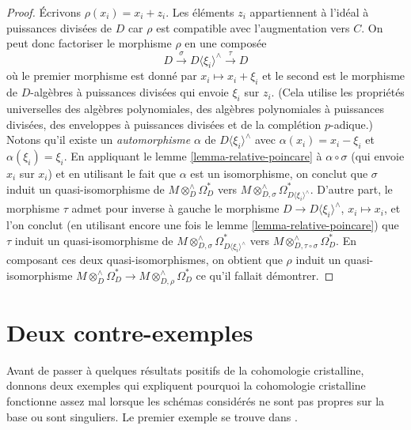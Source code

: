 \begin{proof}
\medskip\noindent
Écrivons $\rho(x_i) = x_i + z_i$. Les éléments $z_i$ appartiennent à
l'idéal à puissances divisées de $D$ car $\rho$ est compatible avec
l'augmentation vers $C$. On peut donc factoriser le morphisme $\rho$
en une composée
$$
D \xrightarrow{\sigma} D\langle \xi_i \rangle^\wedge \xrightarrow{\tau} D
$$
où le premier morphisme est donné par $x_i \mapsto x_i + \xi_i$ et le
second est le morphisme de $D$-algèbres à puissances divisées qui envoie $\xi_i$ sur $z_i$.
(Cela utilise les propriétés universelles des algèbres polynomiales, des algèbres
polynomiales à puissances divisées, des enveloppes à puissances divisées et de la complétion $p$-adique.)
Notons qu'il existe un {\it automorphisme} $\alpha$ de
$D\langle \xi_i \rangle^\wedge$ avec $\alpha(x_i) = x_i - \xi_i$
et $\alpha(\xi_i) = \xi_i$. En appliquant le lemme \ref{lemma-relative-poincare}
à $\alpha \circ \sigma$ (qui envoie $x_i$ sur $x_i$) et en utilisant le fait que
$\alpha$ est un isomorphisme, on conclut que $\sigma$ induit un
quasi-isomorphisme de $M \otimes^\wedge_D \Omega^*_D$ vers
$M \otimes^\wedge_{D, \sigma} \Omega^*_{D\langle \xi_i \rangle^\wedge}$.
D'autre part, le morphisme $\tau$ admet pour inverse à gauche le
morphisme $D \to D\langle \xi_i \rangle^\wedge$, $x_i \mapsto x_i$,
et l'on conclut (en utilisant encore une fois le lemme \ref{lemma-relative-poincare})
que $\tau$ induit un quasi-isomorphisme de
$M \otimes^\wedge_{D, \sigma} \Omega^*_{D\langle \xi_i \rangle^\wedge}$
vers $M \otimes^\wedge_{D, \tau \circ \sigma} \Omega^*_D$. En composant ces
deux quasi-isomorphismes, on obtient que $\rho$ induit un quasi-isomorphisme
$M \otimes^\wedge_D \Omega^*_D \to M \otimes^\wedge_{D, \rho} \Omega^*_D$
ce qu'il fallait démontrer.
\end{proof}










\section{Deux contre-exemples}
\label{section-examples}

\noindent
Avant de passer à quelques résultats positifs de la cohomologie cristalline,
donnons deux exemples qui expliquent pourquoi la cohomologie cristalline
fonctionne assez mal lorsque les schémas considérés ne sont pas
propres sur la base ou sont singuliers. Le premier exemple se trouve
dans \cite{BO}.

